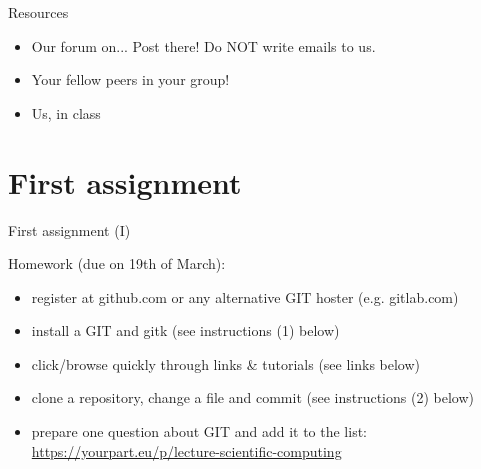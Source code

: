 \documentclass[10pt,color=usenames,dvipsnames]{beamer}
\begin{document}
\begin{frame}{Resources}
	
	\begin{itemize}
		\item Our forum on... Post there! Do NOT write emails to us.
		\item Your fellow peers in your group!
		\item Us, in class
	\end{itemize}


\end{frame}

\section{First assignment}

\begin{frame}{First assignment (I)}


Homework (due on 19th of March):

\begin{itemize}
	
	\item register at github.com or any alternative GIT hoster (e.g. gitlab.com)
	\item install a GIT and gitk (see instructions (1) below)
	\item click/browse quickly through links \& tutorials (see links below)
	\item  clone a repository, change a file and commit (see instructions (2) below)
	\item prepare one question about GIT and add it to the list: \href{https://yourpart.eu/p/lecture-scientific-computing}{https://yourpart.eu/p/lecture-scientific-computing}

\end{itemize}


\end{frame}
\end{document}
